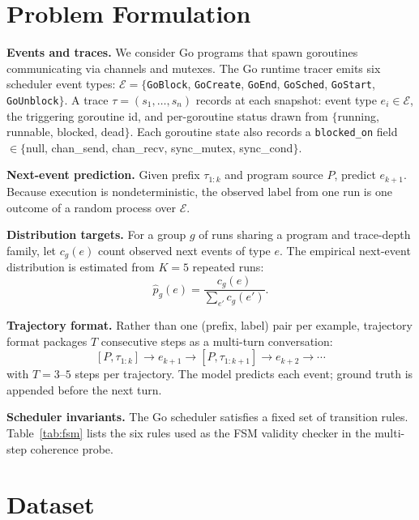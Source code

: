 \documentclass[10pt,conference]{IEEEtran}
\newcommand{\eblock}{\texttt{GoBlock}}
\newcommand{\eunblock}{\texttt{GoUnblock}}
\newcommand{\estart}{\texttt{GoStart}}
\newcommand{\ecreate}{\texttt{GoCreate}}
\newcommand{\eend}{\texttt{GoEnd}}
\newcommand{\esched}{\texttt{GoSched}}
\begin{document}
\section{Problem Formulation}\label{sec:problem}

\textbf{Events and traces.}
We consider Go programs that spawn goroutines communicating via channels
and mutexes.
The Go runtime tracer emits six scheduler event types:
$\mathcal{E}=\{$\eblock, \ecreate, \eend, \esched, \estart,
\eunblock$\}$.
A trace $\tau{=}(s_1,\dots,s_n)$ records at each snapshot: event type
$e_i\in\mathcal{E}$, the triggering goroutine id, and per-goroutine
status drawn from $\{$running, runnable, blocked, dead$\}$.
Each goroutine state also records a \texttt{blocked\_on} field
$\in\{$null, chan\_send, chan\_recv, sync\_mutex, sync\_cond$\}$.

\textbf{Next-event prediction.}
Given prefix $\tau_{1:k}$ and program source $P$, predict $e_{k+1}$.
Because execution is nondeterministic, the observed label from one run
is one outcome of a random process over $\mathcal{E}$.

\textbf{Distribution targets.}
For a group $g$ of runs sharing a program and trace-depth family, let
$c_g(e)$ count observed next events of type $e$.
The empirical next-event distribution is estimated from $K{=}5$ repeated runs:
\begin{equation}\label{eq:dist}
\hat{p}_g(e)=\frac{c_g(e)}{\sum_{e'}c_g(e')}.
\end{equation}

\textbf{Trajectory format.}
Rather than one (prefix, label) pair per example, trajectory format
packages $T$ consecutive steps as a multi-turn conversation:
\begin{equation}\label{eq:traj}
[P,\tau_{1:k}]\!\to\!e_{k+1}\!\to\![P,\tau_{1:k+1}]\!\to\!e_{k+2}\!\to\!\cdots
\end{equation}
with $T{=}3\text{--}5$ steps per trajectory.
The model predicts each event; ground truth is appended before the
next turn.

\textbf{Scheduler invariants.}
The Go scheduler satisfies a fixed set of transition rules.
Table~\ref{tab:fsm} lists the six rules used as the FSM validity
checker in the multi-step coherence probe.

\section{Dataset}\label{sec:data}
\end{document}
